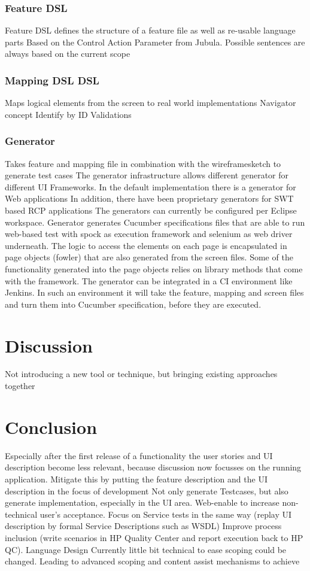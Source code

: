 \documentclass{sig-alternate-05-2015}
\begin{document}
\subsubsection{Feature DSL}
Feature DSL defines the structure of a feature file as well as re-usable language parts
Based on the Control Action Parameter from Jubula.
Possible sentences are always based on the current scope

\subsubsection{Mapping DSL DSL}
Maps logical elements from the screen to real world implementations
Navigator concept
Identify by ID
Validations

\subsubsection{Generator}
Takes feature and mapping file in combination with the wireframesketch to generate test cases
The generator infrastructure allows different generator for different UI Frameworks. In the default implementation there is a generator for Web applications
In addition, there have been proprietary generators for SWT based RCP applications
The generators can currently be configured per Eclipse workspace.
Generator generates Cucumber specifications files that are able to run web-based test with spock as execution framework and selenium as web driver underneath. 
The logic to access the elements on each page is encapsulated in page objects (fowler) that are also generated from the screen files. Some of the functionality generated into the page objects relies on library methods that come with the framework. 
The generator can be integrated in a CI environment like Jenkins. In such an environment it will take the feature, mapping and screen files and turn them into Cucumber specification, before they are executed. 

\section{Discussion}\label{sec:Discussion}
Not introducing a new tool or technique, but bringing existing approaches together

\section{Conclusion}\label{sec:Conclusion} %
Especially after the first release of a functionality the user stories and UI description become less relevant, because discussion now focusses on the running application. Mitigate this by putting the feature description and the UI description in the focus of development 
Not only generate Testcases, but also generate implementation, especially in the UI area.
Web-enable to increase non-technical user’s acceptance. 
Focus on Service tests in the same way (replay UI description by formal Service Descriptions such as WSDL)
Improve process inclusion (write scenarios in HP Quality Center and report execution back to HP QC). 
Language Design Currently little bit technical to ease scoping could be changed. Leading to advanced scoping and content assist mechanisms to achieve 
\end{document}
